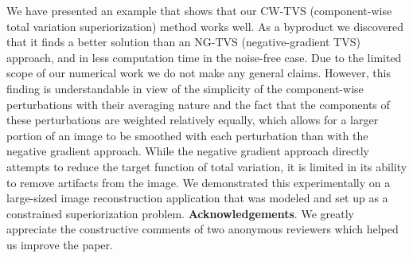 \documentclass[smallextended]{svjour3}      %
\begin{document}
We have presented an example that shows that our CW-TVS (component-wise total variation superiorization) method works well. As a byproduct we discovered that it finds a better solution than an NG-TVS (negative-gradient TVS) approach, and in less computation time in the noise-free case. Due to the limited scope of our numerical work we do not make any general claims. However, this finding is understandable in view of the simplicity of the component-wise perturbations with their averaging nature and the fact that the components of these perturbations are weighted relatively equally, which allows for a larger portion of an image to be smoothed with each perturbation than with the negative gradient approach. While the negative gradient approach directly attempts to reduce the target function of total variation, it is limited in its ability to remove artifacts from the image. We demonstrated this experimentally on a large-sized image reconstruction application that was modeled and set up as a constrained superiorization problem.
\newline
\newline
{\textbf{Acknowledgements}. We greatly appreciate the constructive comments of two anonymous reviewers which helped us improve the paper.}


\end{document}
